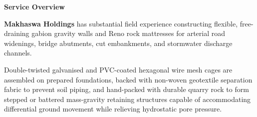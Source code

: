 \documentclass[a4paper,11pt]{article}
\begin{document}
\noindent
\begin{minipage}[t]{0.63\textwidth}
    \vspace{0pt}
    {\large\bfseries\color{mhnavy} Service Overview}
    \vspace{0.08cm}

    {\fontsize{8.7pt}{12.3pt}\selectfont\color{mhtext}
    \textbf{Makhaswa Holdings} has substantial field experience constructing flexible, free-draining gabion gravity walls and Reno rock mattresses for arterial road widenings, bridge abutments, cut embankments, and stormwater discharge channels.
    }

    \vspace{0.15cm}

    {\fontsize{8.7pt}{12.3pt}\selectfont\color{mhtext}
    Double-twisted galvanised and PVC-coated hexagonal wire mesh cages are assembled on prepared foundations, backed with non-woven geotextile separation fabric to prevent soil piping, and hand-packed with durable quarry rock to form stepped or battered mass-gravity retaining structures capable of accommodating differential ground movement while relieving hydrostatic pore pressure.
    }
\end{minipage}
\hfill
\end{document}
